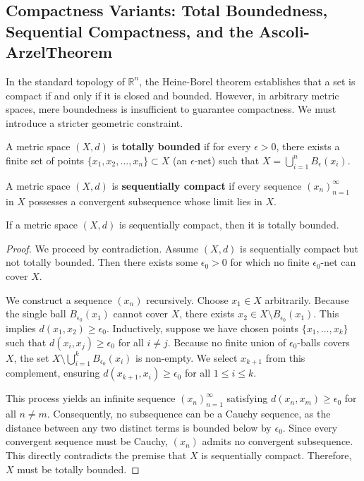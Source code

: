 \subsection{Compactness Variants: Total Boundedness, Sequential Compactness, and the Ascoli-Arzel\à Theorem}

In the standard topology of $\mathbb{R}^n$, the Heine-Borel theorem establishes that a set is compact if and only if it is closed and bounded. However, in arbitrary metric spaces, mere boundedness is insufficient to guarantee compactness. We must introduce a stricter geometric constraint.

\begin{definition}
A metric space $(X, d)$ is \textbf{totally bounded} if for every $\epsilon > 0$, there exists a finite set of points $\{x_1, x_2, \dots, x_n\} \subset X$ (an $\epsilon$-net) such that $X = \bigcup_{i=1}^n B_\epsilon(x_i)$.
\end{definition}

\begin{definition}
A metric space $(X, d)$ is \textbf{sequentially compact} if every sequence $(x_n)_{n=1}^\infty$ in $X$ possesses a convergent subsequence whose limit lies in $X$.
\end{definition}

\begin{theorem}
If a metric space $(X, d)$ is sequentially compact, then it is totally bounded.
\end{theorem}

\begin{proof}
We proceed by contradiction. Assume $(X, d)$ is sequentially compact but not totally bounded. Then there exists some $\epsilon_0 > 0$ for which no finite $\epsilon_0$-net can cover $X$. 

We construct a sequence $(x_n)$ recursively. Choose $x_1 \in X$ arbitrarily. Because the single ball $B_{\epsilon_0}(x_1)$ cannot cover $X$, there exists $x_2 \in X \setminus B_{\epsilon_0}(x_1)$. This implies $d(x_1, x_2) \ge \epsilon_0$. 
Inductively, suppose we have chosen points $\{x_1, \dots, x_k\}$ such that $d(x_i, x_j) \ge \epsilon_0$ for all $i \neq j$. Because no finite union of $\epsilon_0$-balls covers $X$, the set $X \setminus \bigcup_{i=1}^k B_{\epsilon_0}(x_i)$ is non-empty. We select $x_{k+1}$ from this complement, ensuring $d(x_{k+1}, x_i) \ge \epsilon_0$ for all $1 \le i \le k$.

This process yields an infinite sequence $(x_n)_{n=1}^\infty$ satisfying $d(x_n, x_m) \ge \epsilon_0$ for all $n \neq m$. Consequently, no subsequence can be a Cauchy sequence, as the distance between any two distinct terms is bounded below by $\epsilon_0$. Since every convergent sequence must be Cauchy, $(x_n)$ admits no convergent subsequence. This directly contradicts the premise that $X$ is sequentially compact. Therefore, $X$ must be totally bounded.
\end{proof}

